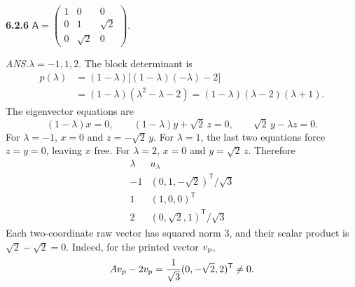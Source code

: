 \par\bigskip
\noindent\textbf{6.2.6}\quad
$\mathsf{A}=\begin{pmatrix}1&0&0\\0&1&\sqrt{2}\\0&\sqrt{2}&0\end{pmatrix}$.
\par\nobreak\hfill\emph{ANS.}\enspace $\lambda=-1,1,2$.
\solution
The block determinant is
\begin{align*}
p(\lambda)
&=(1-\lambda)\bigl[(1-\lambda)(-\lambda)-2\bigr]\\
&=(1-\lambda)(\lambda^2-\lambda-2)
=(1-\lambda)(\lambda-2)(\lambda+1).
\end{align*}
The eigenvector equations are
\[
(1-\lambda)x=0,\qquad(1-\lambda)y+\sqrt2\,z=0,
\qquad\sqrt2\,y-\lambda z=0.
\]
For $\lambda=-1$, $x=0$ and $z=-\sqrt2\,y$.
For $\lambda=1$, the last two equations force $z=y=0$, leaving $x$
free. For $\lambda=2$, $x=0$ and $y=\sqrt2\,z$. Therefore
\[
\boxed{\begin{array}{c|c}
\lambda&u_\lambda\\\hline
-1&(0,1,-\sqrt2)^{\mathsf T}/\sqrt3\\
1&(1,0,0)^{\mathsf T}\\
2&(0,\sqrt2,1)^{\mathsf T}/\sqrt3
\end{array}}
\]
Each two-coordinate raw vector has squared norm $3$, and their scalar
product is $\sqrt2-\sqrt2=0$.
Indeed, for the printed vector $v_{\rm p}$,
\[
 Av_{\rm p}-2v_{\rm p}
 =\frac1{\sqrt3}(0,-\sqrt2,2)^{\mathsf T}\ne0.
\]

